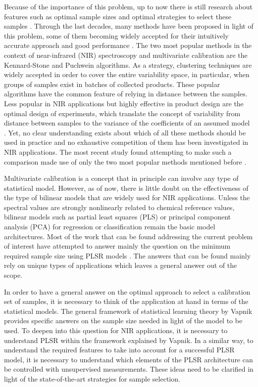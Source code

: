 \documentclass[journal=ancham,manuscript=article]{achemso}
\begin{document}
Because of the importance of this problem, up to now there is still research about features such as optimal sample sizes and optimal strategies to select these samples \cite{Au2020, Liu2019}. Through the last decades, many methods have been proposed in light of this problem, some of them becoming widely accepted for their intuitively accurate approach and good performance \cite{Shetty2012a, Nawar2018, He2015}. The two most popular methods in the context of near-infrared (NIR) spectroscopy and multivariate calibration are the Kennard-Stone\cite{Kennard1969} and  Puchwein\cite{Puchwein1988} algorithms. As a strategy, clustering techniques are widely accepted in order to cover the entire variability space\cite{Naes1990}, in particular, when groups of samples exist in batches of collected products\cite{Bobelyn2010}. These popular algorithms have the common feature of relying in distance between the samples. Less popular in NIR applications but highly effective in product design are the optimal design of experiments, which translate the concept of variability from distance between samples to the variance of the coefficients of an assumed model \cite{Goos2011}. Yet, no clear understanding exists about which of all these methods should be used in practice and no exhaustive competition of them has been investigated in NIR applications. The most recent study found attempting to make such a comparison made use of only the two most popular methods mentioned before \cite{Au2020}.

Multivariate calibration is a concept that in principle can involve any type of statistical model. However, as of now, there is little doubt on the effectiveness of the type of bilinear models that are widely used for NIR applications. Unless the spectral values are strongly nonlinearly related to chemical reference values, bilinear models such as partial least squares (PLS) or principal component analysis (PCA) for regression or classification remain the basic model architectures. Most of the work that can be found addressing the current problem of interest have attempted to answer mainly the question on the minimum required sample size using PLSR models \cite{Naes1990, Au2020, Shetty2012a, Rodionova2008}. The answers that can be found mainly rely on unique types of applications which leaves a general answer out of the scope. 

In order to have a general answer on the optimal approach to select a calibration set of samples, it is necessary to think of the application at hand in terms of the statistical models. The general framework of statistical learning theory by Vapnik \cite{Vapnik2019, Vapnik2000} provides specific answers on the sample size needed in light of the model to be used. To deepen into this question for NIR applications, it is necessary to understand PLSR within the framework explained by Vapnik. In a similar way, to understand the required features to take into account for a successful PLSR model, it is necessary to understand which elements of the PLSR architecture can be controlled with unsupervised measurements. These ideas need to be clarified in light of the state-of-the-art strategies for sample selection.
\end{document}
